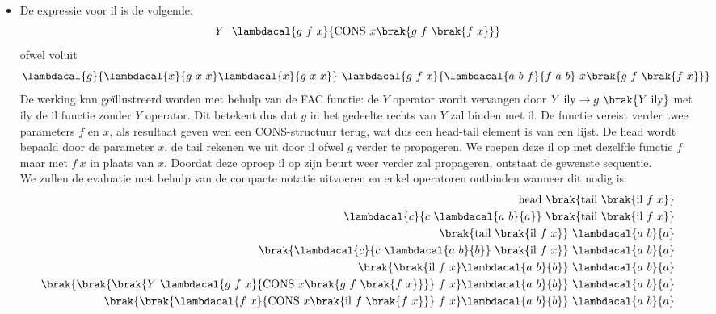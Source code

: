 \documentclass[fleqn]{article}
\newcommand{\cons}{\mbox{CONS}}
\begin{document}
\begin{answer}\hfill
\begin{itemize}
 \item De expressie voor $\mbox{il}$ is de volgende:
\begin{equation}
Y\ \ \lambdacal{g\ f\ x}{\cons\ x \brak{g\ f\ \brak{f\ x}}}
\end{equation} ofwel voluit
\begin{equation}
\lambdacal{g}{\lambdacal{x}{g\ x\ x}\lambdacal{x}{g\ x\ x}}\ \lambdacal{g\ f\ x}{\lambdacal{a\ b\ f}{f\ a\ b}\ x \brak{g\ f\ \brak{f\ x}}}
\end{equation}
De werking kan ge\"illustreerd worden met behulp van de \mbox{FAC} functie: de $Y$ operator wordt vervangen door $Y\ \mbox{ily}\rightarrow g\ \brak{Y\ \mbox{ily}}$ met $\mbox{ily}$ de $\mbox{il}$ functie zonder $Y$ operator. Dit betekent dus dat $g$ in het gedeelte rechts van $Y$ zal binden met $\mbox{il}$. De functie vereist verder twee parameters $f$ en $x$, als resultaat geven wen een $\mbox{CONS}$-structuur terug, wat dus een head-tail element is van een lijst. De head wordt bepaald door de parameter $x$, de tail rekenen we uit door $\mbox{il}$ ofwel $g$ verder te propageren. We roepen deze $\mbox{il}$ op met dezelfde functie $f$ maar met $f\ x$ in plaats van $x$. Doordat deze oproep $\mbox{il}$ op zijn beurt weer verder zal propageren, ontstaat de gewenste sequentie.\\
We zullen de evaluatie met behulp van de compacte notatie uitvoeren en enkel operatoren ontbinden wanneer dit nodig is:
\begin{eqnarray}
\mbox{head}\ \brak{\mbox{tail}\ \brak{\mbox{il}\ f\ x}}\hfill\\
\lambdacal{c}{c\ \lambdacal{a\ b}{a}}\ \brak{\mbox{tail}\ \brak{ \mbox{il}\ f\ x }}\hfill\\
\brak{\mbox{tail}\ \brak{ \mbox{il}\ f\ x }}\ \lambdacal{a\ b}{a}\hfill\\
\brak{\lambdacal{c}{c\ \lambdacal{a\ b}{b}}\ \brak{ \mbox{il}\ f\ x }}\ \lambdacal{a\ b}{a}\hfill\\
\brak{\brak{ \mbox{il}\ f\ x } \lambdacal{a\ b}{b}}\ \lambdacal{a\ b}{a}\hfill\\
\brak{\brak{ \brak{ Y\ \lambdacal{g\ f\ x}{\cons\ x \brak{g\ f\ \brak{f\ x}}} }\ f\ x } \lambdacal{a\ b}{b}}\ \lambdacal{a\ b}{a}\hfill\\
\brak{\brak{ \lambdacal{f\ x}{\cons\ x \brak{\mbox{il}\ f\ \brak{f\ x}}}\ f\ x } \lambdacal{a\ b}{b}}\ \lambdacal{a\ b}{a}\hfill\\

\end{eqnarray}
\end{itemize}
\end{answer}
\end{document}
